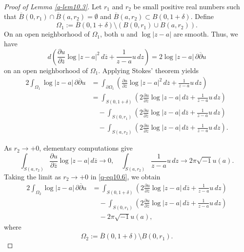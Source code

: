 \documentclass[12pt,twoside]{amsart}
\theoremstyle{definition}
\begin{document}
\begin{proof}[Proof of Lemma \ref{q-lem10.3}]
Let $r_1$ and $r_2$ be small positive real numbers such that 
$\overline B(0, r_1)\cap 
\overline B(a, r_2)=\emptyset$ 
and $\overline B(a, r_2) \subset B(0, 1+\delta)$.  
Define
\[
\Omega_1 := \overline{B}(0, 1+\delta) \setminus 
\left( B(0, r_1) \cup B(a, r_2) \right).
\]
On an open neighborhood of $\Omega_1$, both $u$ and $\log |z - a|$ are smooth. 
Thus, we have
\[
d\left( \frac{\partial u}{\partial \overline{z}} \log|z-a|^2\, d\overline{z}
+ \frac{1}{z-a} u\, dz \right)
= 2\log|z-a|\, \partial \overline{\partial} u
\]
on an open neighborhood of $\Omega_1$. Applying Stokes' theorem yields
\begin{equation}\label{q-eq10.6}
\begin{split}
2\int_{\Omega_1} \log|z-a|\, \partial \overline{\partial} u
&= \int_{\partial \Omega_1}
\left( \frac{\partial u}{\partial \overline{z}} \log|z-a|^2\, d\overline{z}
+ \frac{1}{z-a} u\, dz \right) \\
&= \int_{S(0,1+\delta)}
\left( 2 \frac{\partial u}{\partial \overline{z}} \log|z-a|\, d\overline{z}
+ \frac{1}{z-a} u\, dz \right) \\
&\quad - \int_{S(0,r_1)}
\left( 2 \frac{\partial u}{\partial \overline{z}} \log|z-a|\, d\overline{z}
+ \frac{1}{z-a} u\, dz \right) \\
&\quad - \int_{S(a,r_2)}
\left( 2 \frac{\partial u}{\partial \overline{z}} \log|z-a|\, d\overline{z}
+ \frac{1}{z-a} u\, dz \right).
\end{split}
\end{equation}

As $r_2 \to +0$, elementary computations give
\[
\int_{S(a,r_2)} \frac{\partial u}{\partial \overline{z}} \log|z-a|\, d\overline{z} \to 0, 
\quad
\int_{S(a,r_2)} \frac{1}{z-a} u\, dz \to 2\pi \sqrt{-1} u(a).
\]
Taking the limit as $r_2 \to +0$ in \eqref{q-eq10.6}, we obtain
\begin{equation*}
\begin{split}
2 \int_{\Omega_2} \log|z-a|\, \partial \overline{\partial} u
&= \int_{S(0,1+\delta)}
\left( 2 \frac{\partial u}{\partial \overline{z}} \log|z-a|\, d\overline{z}
+ \frac{1}{z-a} u\, dz \right) \\
&\quad - \int_{S(0,r_1)}
\left( 2 \frac{\partial u}{\partial \overline{z}} \log|z-a|\, d\overline{z}
+ \frac{1}{z-a} u\, dz \right) \\
&\quad - 2\pi \sqrt{-1} u(a),
\end{split}
\end{equation*}
where
\[
\Omega_2 := \overline{B}(0,1+\delta) \setminus B(0, r_1).
\]


\end{proof}
\end{document}
